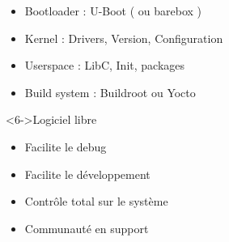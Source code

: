 \begin{frame}
	\begin{itemize}
		\item<2-> Bootloader : U-Boot ( ou barebox )
		\item<3-> Kernel : Drivers, Version, Configuration
		\item<4-> Userspace : LibC, Init, packages
		\item<5-> Build system : Buildroot ou Yocto
	\end{itemize}
	\begin{block}<6->{Logiciel libre}
		\begin{itemize}
			\item Facilite le debug
			\item Facilite le développement
			\item Contrôle total sur le système
			\item Communauté en support
		\end{itemize}
	\end{block}
\end{frame}

\begin{frame}
\end{frame}
